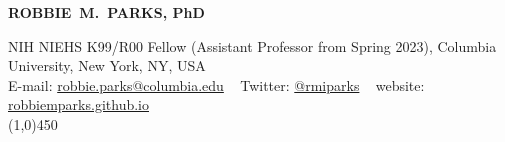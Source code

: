 \begin{center}

\textbf{{\LARGE ROBBIE~M.~PARKS, PhD}\\}

\small NIH NIEHS K99/R00 Fellow (Assistant Professor from Spring 2023), Columbia University, New York, NY, USA\\


E-mail: \href{mailto:robbie.parks@columbia.edu}{robbie.parks@columbia.edu} ~ Twitter: \href{https://twitter.com/rmiparks}{@rmiparks} ~ website: \href{https://robbiemparks.github.io}{robbiemparks.github.io}\\

\line(1,0){450}

\end{center}